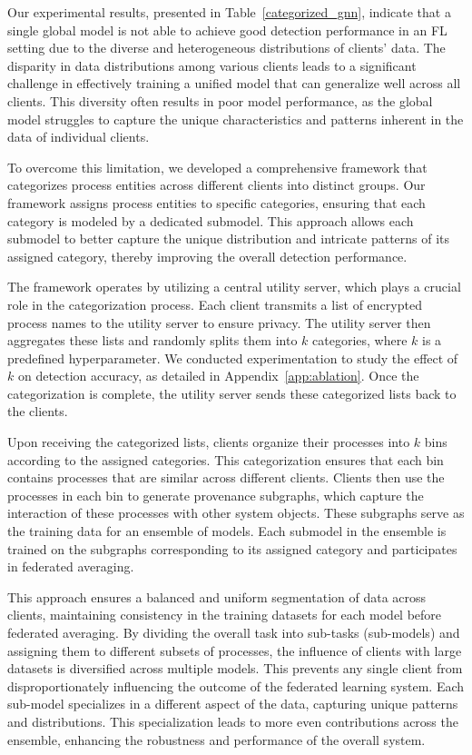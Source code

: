 Our experimental results, presented in Table~\ref{categorized_gnn}, indicate that a single global \gnnshort model is not able to achieve good detection performance in an FL setting due to the diverse and heterogeneous distributions of clients' data. The disparity in data distributions among various clients leads to a significant challenge in effectively training a unified model that can generalize well across all clients. This diversity often results in poor model performance, as the global model struggles to capture the unique characteristics and patterns inherent in the data of individual clients.

To overcome this limitation, we developed a comprehensive framework that categorizes process entities across different clients into distinct groups. Our framework assigns process entities to specific categories, ensuring that each category is modeled by a dedicated submodel. This approach allows each submodel to better capture the unique distribution and intricate patterns of its assigned category, thereby improving the overall detection performance.

The framework operates by utilizing a central utility server, which plays a crucial role in the categorization process. Each client transmits a list of encrypted process names to the utility server to ensure privacy. The utility server then aggregates these lists and randomly splits them into \(k\) categories, where \(k\) is a predefined hyperparameter. We conducted experimentation to study the effect of \(k\) on detection accuracy, as detailed in Appendix~\ref{app:ablation}. Once the categorization is complete, the utility server sends these categorized lists back to the clients.

Upon receiving the categorized lists, clients organize their processes into \(k\) bins according to the assigned categories. This categorization ensures that each bin contains processes that are similar across different clients. Clients then use the processes in each bin to generate provenance subgraphs, which capture the interaction of these processes with other system objects. These subgraphs serve as the training data for an ensemble of \gnnshort models. Each submodel in the ensemble is trained on the subgraphs corresponding to its assigned category and participates in federated averaging.

This approach ensures a balanced and uniform segmentation of data across clients, maintaining consistency in the training datasets for each \gnnshort model before federated averaging. By dividing the overall task into sub-tasks (sub-models) and assigning them to different subsets of processes, the influence of clients with large datasets is diversified across multiple models. This prevents any single client from disproportionately influencing the outcome of the federated learning system. Each sub-model specializes in a different aspect of the data, capturing unique patterns and distributions. This specialization leads to more even contributions across the ensemble, enhancing the robustness and performance of the overall system.

